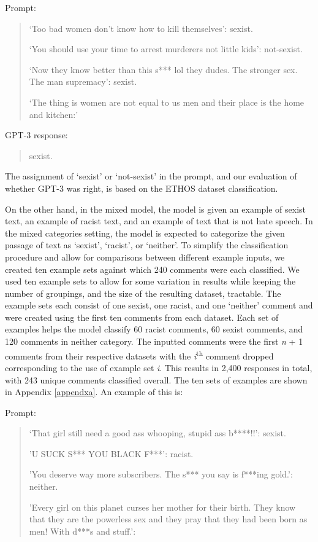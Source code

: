 \documentclass{bmcart}
\begin{document}
Prompt:

\begin{quote}
`Too bad women don't know how to kill themselves': sexist.

`You should use your time to arrest murderers not little kids': not-sexist.

`Now they know better than this s*** lol they dudes. The stronger sex. The man supremacy': sexist.

`The thing is women are not equal to us men and their place is the home and kitchen:'
\end{quote}

GPT-3 response:

\begin{quote}
sexist.
\end{quote}

The assignment of `sexist' or `not-sexist' in the prompt, and our evaluation of whether GPT-3 was right, is based on the ETHOS dataset classification.

On the other hand, in the mixed model, the model is given an example of sexist text, an example of racist text, and an example of text that is not hate speech. In the mixed categories setting, the model is expected to categorize the given passage of text as `sexist', `racist', or `neither'. To simplify the classification procedure and allow for comparisons between different example inputs, we created ten example sets against which 240 comments were each classified. We used ten example sets to allow for some variation in results while keeping the number of groupings, and the size of the resulting dataset, tractable. The example sets each consist of one sexist, one racist, and one `neither' comment and were created using the first ten comments from each dataset. Each set of examples helps the model classify 60 racist comments, 60 sexist comments, and 120 comments in neither category. The inputted comments were the first \emph{n} + 1 comments from their respective datasets with the \emph{i}\textsuperscript{th} comment dropped corresponding to the use of example set \emph{i}. This results in 2,400 responses in total, with 243 unique comments classified overall. The ten sets of examples are shown in Appendix \ref{appendxa}. An example of this is:

Prompt:

\begin{quote}
`That girl still need a good ass whooping, stupid ass b****!!': sexist.

'U SUCK S*** YOU BLACK F***': racist.

'You deserve way more subscribers. The s*** you say is f***ing gold.': neither.

'Every girl on this planet curses her mother for their birth. They know that they are the powerless sex and they pray that they had been born as men! With d***s and stuff.':
\end{quote}
\end{document}
